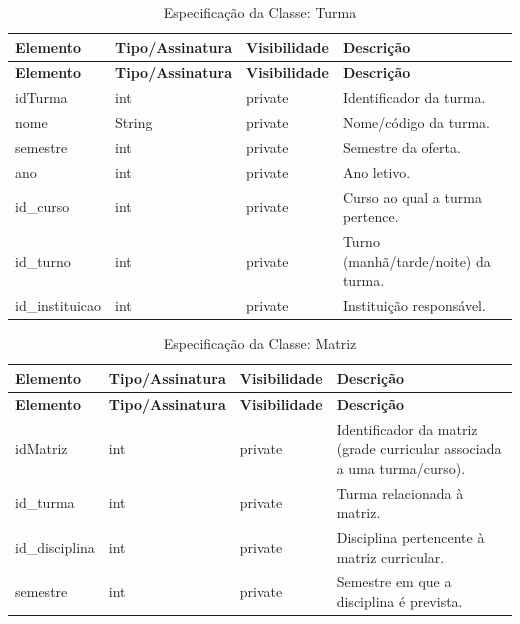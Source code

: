\fonteautores

\vspace{\baselineskip}

\Needspace{0.32\textheight}
\begin{longtable}{|L{3.5cm}|L{3.5cm}|L{3.5cm}|L{3.5cm}|}
\caption{Especificação da Classe: Turma} \\
\hline
\textbf{Elemento} & \textbf{Tipo/Assinatura} & \textbf{Visibilidade} & \textbf{Descrição} \\
\hline
\endfirsthead
\hline
\textbf{Elemento} & \textbf{Tipo/Assinatura} & \textbf{Visibilidade} & \textbf{Descrição} \\
\hline
\endhead
idTurma & int & private & Identificador da turma. \\
\hline
nome & String & private & Nome/código da turma. \\
\hline
semestre & int & private & Semestre da oferta. \\
\hline
ano & int & private & Ano letivo. \\
\hline
id\_curso & int & private & Curso ao qual a turma pertence. \\
\hline
id\_turno & int & private & Turno (manhã/tarde/noite) da turma. \\
\hline
id\_instituicao & int & private & Instituição responsável. \\
\hline
\end{longtable}

\fonteautores

\vspace{\baselineskip}

\Needspace{0.32\textheight}
\begin{longtable}{|L{3.5cm}|L{3.5cm}|L{3.5cm}|L{3.5cm}|}
\caption{Especificação da Classe: Matriz} \\
\hline
\textbf{Elemento} & \textbf{Tipo/Assinatura} & \textbf{Visibilidade} & \textbf{Descrição} \\
\hline
\endfirsthead
\hline
\textbf{Elemento} & \textbf{Tipo/Assinatura} & \textbf{Visibilidade} & \textbf{Descrição} \\
\hline
\endhead
idMatriz & int & private & Identificador da matriz (grade curricular associada a uma turma/curso). \\
\hline
id\_turma & int & private & Turma relacionada à matriz. \\
\hline
id\_disciplina & int & private & Disciplina pertencente à matriz curricular. \\
\hline
semestre & int & private & Semestre em que a disciplina é prevista. \\
\hline
\end{longtable}


